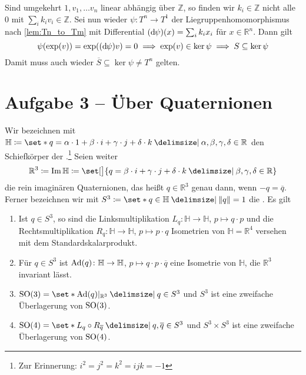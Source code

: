 \begin{beweis}
\begin{enumerate}[(i)]
		Sind umgekehrt $1, v_1, \ldots v_n$ linear abhängig über $\mathbb{Z}$, so finden wir $k_i \in \mathbb{Z}$ nicht alle $0$ mit $\sum_i k_i v_i \in \mathbb{Z}$.
		Sei nun wieder $\psi \colon T^n \to T^1$ der Liegruppenhomomorphismus nach \autoref{lem:Tn_to_Tm} mit Differential $(\mathrm{d}\mkern-1.0mu \psi) (x) = \sum_i k_i x_i$ für $x \in \mathbb{R}^n$.
		Dann gilt
		\[
			\psi \enbrace*{\exp(v)} = \exp \enbrace*{(\mathd \psi) v} = 0 \implies \exp(v) \in \ker \psi \implies S \subseteq \ker \psi
		\]
		Damit muss auch wieder $\overline{S} \subseteq \ker \psi \neq T^n$ gelten.\qedhere
	\end{enumerate}
\end{beweis}

\section{Aufgabe 3 -- Über Quaternionen} %
\label{sec:aufg3}
Wir bezeichnen mit $\mathbb{H} \coloneqq \set*{q = \alpha \cdot 1 + \beta \cdot i + \gamma \cdot j + \delta \cdot k \given \alpha, \beta, \gamma, \delta \in \mathbb{R}}$ den Schiefkörper der .\footnote{Zur Erinnerung: $i^2 = j^2 = k^2 = ijk = -1$}
Seien weiter
\[
	\mathbb{R}^3 \coloneqq \Im \mathbb{H} \coloneqq \set[\big]{q = \beta \cdot i + \gamma \cdot j + \delta \cdot k \given \beta,\gamma,\delta \in \mathbb{R}}
\]
die rein imaginären Quaternionen, das heißt $q \in \mathbb{R}^3$ genau dann, wenn $-q = \overline{q}$.
Ferner bezeichnen wir mit $S^3 \coloneqq \set*{q \in \mathbb{H} \given \norm*{q}=1}$ die .
Es gilt
\begin{enumerate}[(1)]
	\item Ist $q \in S^3$, so sind die Linksmultiplikation $L_q \colon \mathbb{H} \to \mathbb{H}$, $p \mapsto q \cdot p$ und die Rechtsmultiplikation $R_q \colon \mathbb{H} \to \mathbb{H}$, $p \mapsto p \cdot q$ Isometrien von $\mathbb{H}=\mathbb{R}^4$ versehen mit dem Standardskalarprodukt.
	\item Für $q \in S^3$ ist $\operatorname{Ad}(q) \colon \mathbb{H} \to \mathbb{H}$, $p \mapsto q \cdot p \cdot \overline{q}$ eine Isometrie von $\mathbb{H}$, die $\mathbb{R}^3$ invariant lässt.
	\item $\SO(3) = \set*{\Ad(q)|_{\mathbb{R}^3} \given q \in S^3}$ und $S^3$ ist eine zweifache Überlagerung von $\operatorname{SO}(3)$.
	\item $\SO(4) = \set*{L_q \circ R_{\overline{q}} \given q,\overline{q} \in S^3}$ und $S^3 \times S^3$ ist eine zweifache Überlagerung von $\operatorname{SO}(4)$.
\end{enumerate}
